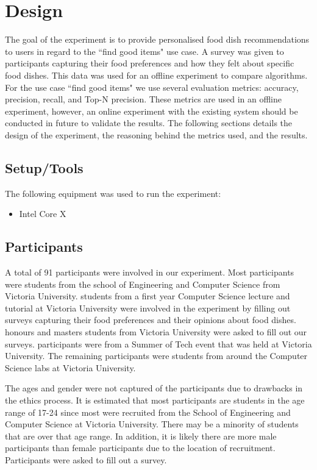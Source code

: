 \section{Design}

The goal of the experiment is to provide personalised food dish recommendations to users in regard to the ``find good items" use case. A survey was given to participants capturing their food preferences and how they felt about specific food dishes. This data was used for an offline experiment to compare algorithms. For the use case ``find good items" we use several evaluation metrics: accuracy, precision, recall, and Top-N precision. These metrics are used in an offline experiment, however, an online experiment with the existing system should be conducted in future to validate the results. 
The following sections details the design of the experiment, the reasoning behind the metrics used, and the results. 

\subsection{Setup/Tools}
The following equipment was used to run the experiment:
\begin{itemize}
	\item{Intel Core X}
\end{itemize}

\subsection{Participants}

A total of 91 participants were involved in our experiment. Most participants were students from the school of Engineering and Computer Science from Victoria University.  students from a first year Computer Science lecture and tutorial at Victoria University were involved in the experiment by filling out surveys capturing their food preferences and their opinions about food dishes.  honours and masters students from Victoria University were asked to fill out our surveys.  participants were from a Summer of Tech event that was held at Victoria University. The remaining participants were students from around the Computer Science labs at Victoria University.

The ages and gender were not captured of the participants due to drawbacks in the ethics process. It is estimated that most participants are students in the age range of 17-24 since most were recruited from the School of Engineering and Computer Science at Victoria University. There may be a minority of students that are over that age range. In addition, it is likely there are more male participants than female participants due to the location of recruitment. Participants were asked to fill out a survey.

